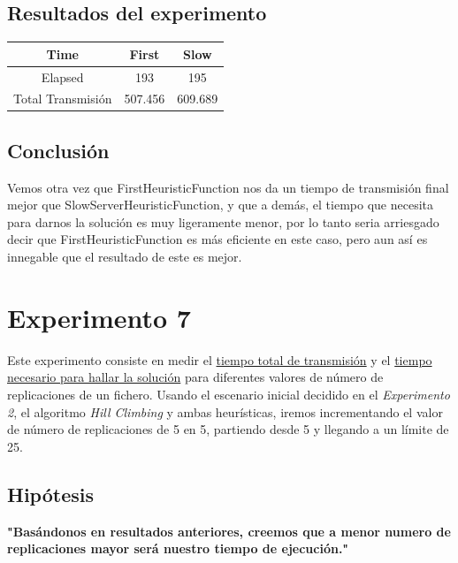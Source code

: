 \documentclass[a4paper,10pt]{report}
\begin{document}
		\subsection*{Resultados del experimento}
		\begin{table}[H]
		\centering
        \begin{tabular}{c|c|c}
            Time & First & Slow \\
            \hline
            \hline
            Elapsed & 193 & 195 \\
            \hline
            Total Transmisión & 507.456 & 609.689 \\
        \end{tabular}
        \end{table}
		
		\subsection*{Conclusión}
		Vemos otra vez que FirstHeuristicFunction nos da un tiempo de transmisión final mejor que SlowServerHeuristicFunction, y que a demás, el tiempo que necesita para darnos la solución es muy ligeramente menor, por lo tanto seria arriesgado decir que FirstHeuristicFunction es más eficiente en este caso, pero aun así es innegable que el resultado de este es mejor.
		
		
	\newpage
	\section*{Experimento 7}

		Este experimento consiste en medir el \uline{tiempo total de transmisión} y el \uline{tiempo necesario para hallar la solución} para diferentes valores de número de replicaciones de un fichero.\newline
		Usando el escenario inicial decidido en el \textit{Experimento 2}, el algoritmo \textit{Hill Climbing} y ambas heurísticas, iremos incrementando el valor de número de replicaciones de 5 en 5, partiendo desde 5 y llegando a un límite de 25. 
		
		\subsection*{Hipótesis}
		\textbf{"Basándonos en resultados anteriores, creemos que a menor numero de replicaciones mayor será nuestro tiempo de ejecución."}
\end{document}
